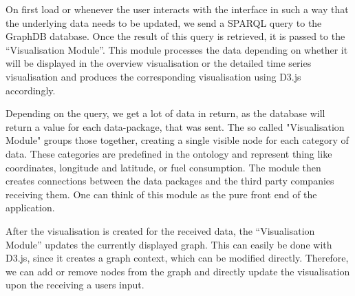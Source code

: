 \documentclass[../paper.tex]{subfiles}
\begin{document}
  On first load or whenever the user interacts with the interface in such a way
  that the underlying data needs to be updated, we send a SPARQL query to the
  GraphDB database. Once the result of this query is retrieved, it is passed to
  the “Visualisation Module”. This module processes the data depending on
  whether it will be displayed in the overview visualisation or the detailed
  time series visualisation and produces the corresponding visualisation
  using D3.js accordingly.

  Depending on the query, we get a lot of data in return, as the database
  will return a value for each data-package, that was sent. The so called
  "Visualisation Module" groups those together, creating a single visible
  node for each category of data. These categories are predefined in the
  ontology and represent thing like coordinates, longitude and latitude, or
  fuel consumption. The module then creates connections between the data packages
  and the third party companies receiving them. One can think of this module
  as the pure front end of the application.

  After the visualisation is created for the received data, the “Visualisation Module”
  updates the currently displayed graph. This can easily be done with D3.js, since
  it creates a graph context, which can be modified directly. Therefore,
  we can add or remove nodes from the graph and directly update the visualisation
  upon the receiving a users input.
\end{document}
